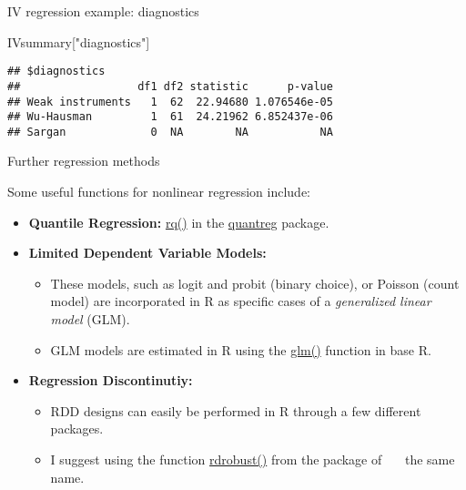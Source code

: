 \documentclass[ignorenonframetext,]{beamer}
\newenvironment{Shaded}{\begin{snugshade}}{\end{snugshade}}
\newcommand{\StringTok}[1]{\textcolor[rgb]{0.02,0.61,0.04}{#1}}
\newcommand{\NormalTok}[1]{\textcolor[rgb]{0.74,0.68,0.62}{#1}}
\providecommand{\tightlist}{%
  \setlength{\itemsep}{0pt}\setlength{\parskip}{0pt}}
\begin{document}
\begin{frame}[fragile]{IV regression example: diagnostics}

\begin{Shaded}
\begin{Highlighting}[]
\NormalTok{IVsummary[}\StringTok{"diagnostics"}\NormalTok{]}
\end{Highlighting}
\end{Shaded}

\begin{verbatim}
## $diagnostics
##                  df1 df2 statistic      p-value
## Weak instruments   1  62  22.94680 1.076546e-05
## Wu-Hausman         1  61  24.21962 6.852437e-06
## Sargan             0  NA        NA           NA
\end{verbatim}

\end{frame}

\begin{frame}{Further regression methods}

Some useful functions for nonlinear regression include:

\begin{itemize}
\item
  \textbf{Quantile Regression:}
  \href{https://www.rdocumentation.org/packages/quantreg/versions/5.34/topics/rq}{rq()}
  in the
  \href{https://www.rdocumentation.org/packages/quantreg/}{quantreg}
  package.
\item
  \textbf{Limited Dependent Variable Models:}

  \begin{itemize}
  \item
    These models, such as logit and probit (binary choice), or Poisson
    (count model) are incorporated in R as specific cases of a
    \emph{generalized linear model} (GLM).
  \item
    GLM models are estimated in R using the
    \href{https://www.rdocumentation.org/packages/stats/versions/3.4.3/topics/glm}{glm()}
    function in base R.
  \end{itemize}
\item
  \textbf{Regression Discontinutiy:}

  \begin{itemize}
  \tightlist
  \item
    RDD designs can easily be performed in R through a few different
    packages.
  \item
    I suggest using the function
    \href{https://www.rdocumentation.org/packages/rdrobust/versions/0.98/topics/rdrobust}{rdrobust()}
    from the package of ~~~the same name.
  \end{itemize}
\end{itemize}

\end{frame}
\end{document}
